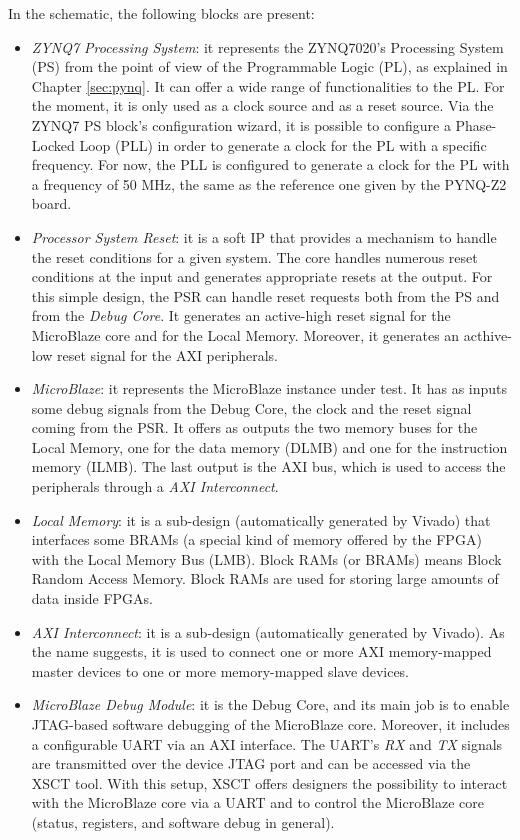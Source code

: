 In the schematic, the following blocks are present:
\begin{itemize}
    \item \textit{ZYNQ7 Processing System}: it represents the ZYNQ7020's Processing System (PS) from the point of view of the Programmable Logic (PL), as explained in Chapter \ref{sec:pynq}. It can offer a wide range of functionalities to the PL. For the moment, it is only used as a clock source and as a reset source. Via the ZYNQ7 PS block's configuration wizard, it is possible to configure a Phase-Locked Loop (PLL) in order to generate a clock for the PL with a specific frequency. For now, the PLL is configured to generate a clock for the PL with a frequency of 50 MHz, the same as the reference one given by the PYNQ-Z2 board.
    \item \textit{Processor System Reset}: it is a soft IP that provides a mechanism to handle the reset conditions for a given system. The core handles numerous reset conditions at the input and generates appropriate resets at the output. For this simple design, the PSR can handle reset requests both from the PS and from the \textit{Debug Core}. It generates an active-high reset signal for the MicroBlaze core and for the Local Memory. Moreover, it generates an acthive-low reset signal for the AXI peripherals. 
    \item  \textit{MicroBlaze}: it represents the MicroBlaze instance under test. It has as inputs some debug signals from the Debug Core, the clock and the reset signal coming from the PSR. It offers as outputs the two memory buses for the Local Memory, one for the data memory (DLMB) and one for the instruction memory (ILMB). The last output is the AXI bus, which is used to access the peripherals through a \textit{AXI Interconnect}.
    \item \textit{Local Memory}: it is a sub-design (automatically generated by Vivado) that interfaces some BRAMs (a special kind of memory offered by the FPGA) with the Local Memory Bus (LMB). Block RAMs (or BRAMs) means Block Random Access Memory. Block RAMs are used for storing large amounts of data inside FPGAs.
    \item \textit{AXI Interconnect}: it is a sub-design (automatically generated by Vivado). As the name suggests, it is used to connect one or more AXI memory-mapped master devices to one or more memory-mapped slave devices.
    \item \textit{MicroBlaze Debug Module}: it is the Debug Core, and its main job is to enable JTAG-based software debugging of the MicroBlaze core. Moreover, it includes a configurable UART via an AXI interface. The UART's \textit{RX} and \textit{TX} signals are transmitted over the device JTAG port and can be accessed via the XSCT tool. With this setup, XSCT offers designers the possibility to interact with the MicroBlaze core via a UART and to control the MicroBlaze core (status, registers, and software debug in general).
\end{itemize}

